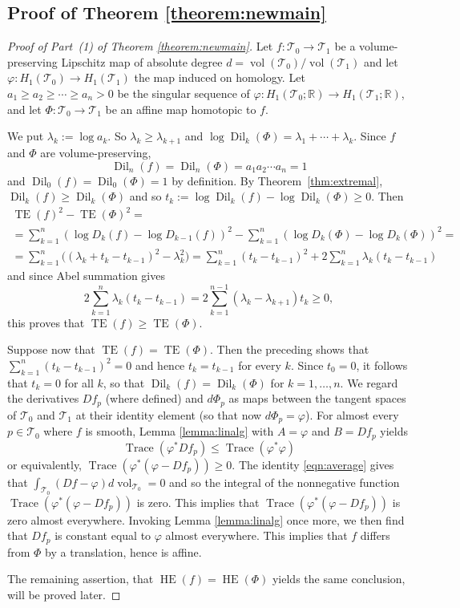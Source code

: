 \documentclass[11pt,letterpaper]{amsart}
\theoremstyle{definition}
\numberwithin{equation}{section}
\theoremstyle{definition}
\newcommand{\Tc}{\mathcal{T}}
\newcommand{\Rb}{\mathbb{R}}
\DeclareMathOperator{\tr}{Trace}
\DeclareMathOperator{\TE}{TE}
\DeclareMathOperator{\HE}{HE}
\newcommand{\Dil}{\operatorname{Dil}}
\newcommand{\vol}{\operatorname{vol}}
\begin{document}
\subsection{Proof of Theorem \ref{theorem:newmain}}
\begin{proof}[Proof of Part~(1) of Theorem \ref{theorem:newmain}]
Let $f:  \Tc_0\to \Tc_1$  be  a volume-preserving Lipschitz map of absolute degree $d=\vol(\Tc_0)/\vol(\Tc_1)$ and let $\varphi: H_1(\Tc_0)\to H_1(\Tc_1)$ the map induced on homology.  Let 
$a_1\ge a_2\ge\cdots \ge a_n>0$ be the singular sequence of 
$\varphi: H_1(\Tc_0; \Rb)\to H_1(\Tc_1; \Rb)$, and let $\Phi:\Tc_0\to\Tc_1$ be an affine map homotopic to $f$. 

We put $\lambda_k:=\log a_k$. So $\lambda_k\ge \lambda_{k+1}$ and 
$\log \Dil_k(\Phi)=\lambda_1+\cdots +\lambda_k$. Since  $f$ and $\Phi$ are volume-preserving, 
\[\Dil_n(f)=\Dil_n(\Phi)=a_1a_2\cdots a_n=1\] 
and $\Dil_0(f)=\Dil_0(\Phi)=1$ by definition. 
By Theorem~\ref{thm:extremal}, $\Dil_k(f)\ge \Dil_k(\Phi)$ and so $t_k:=\log  \Dil_k(f)-\log \Dil_k(\Phi) \ge 0$.  Then
\begin{multline*}
\textstyle     \TE(f)^2-\TE(\Phi)^2 =\\
\textstyle = \sum_{k=1}^n (\log D_k(f)-\log D_{k-1}(f) )^2 -  \sum_{k=1}^n (\log D_k(\Phi)-\log D_k(\Phi))^2=\\
\textstyle =\sum_{k=1}^n  \bigl( (\lambda_k+t_k-t_{k-1})^2 -\lambda_k^2  \bigr) =\sum_{k=1}^n (t_k-t_{k-1})^2  +
2\sum_{k=1}^n\lambda_k(t_k-t_{k-1}) 
\end{multline*}
and since Abel summation gives  
\[
\textstyle  2\sum_{k=1}^n\lambda_k(t_k-t_{k-1})=2\sum_{k=1}^{n-1}(\lambda_k -\lambda_{k+1})t_k\ge 0,
\]
 this proves that $\TE(f)\geq \TE(\Phi)$. 

 
Suppose now that $\TE(f)=\TE(\Phi)$. Then the preceding shows that $\sum_{k=1}^n(t_k-t_{k-1})^2=0$ and hence $t_k=t_{k-1}$ for every $k$. Since 
$t_0=0$, it follows that $t_k=0$ for all $k$, so that $\Dil_k(f)=\Dil_k(\Phi)$ for $k=1, \dots ,n$.
We regard the derivatives $Df_p$ (where defined) and $d\Phi_p$ as maps between the tangent spaces of $\Tc_0$ and $\Tc_1$ at their identity element (so that now $d\Phi_p=\varphi$).  For almost every $p\in \Tc_0$ where $f$ is smooth, Lemma \ref{lemma:linalg} with $A=\varphi$ and $B=Df_p$ yields
\begin{equation}\label{eqn:trace-pointwise}
\tr (\varphi^*Df_p)\le \tr (\varphi^*\varphi)
\end{equation}
or  equivalently,  $\tr (\varphi^*(\varphi-Df_p))\ge 0$. The identity   \eqref{eqn:average}  gives that  $\int_{\Tc_0} (Df-\varphi)  d\!\vol_{\Tc_0}=0$
and so the integral of the nonnegative function $\tr (\varphi^*(\varphi-Df_p))$ is zero. This implies that $\tr (\varphi^*(\varphi-Df_p))$ is zero almost everywhere. Invoking Lemma \ref{lemma:linalg} once more, we then find that $Df_p$ is constant equal to 
$\varphi$ almost everywhere. This implies that $f$ differs from $\Phi$ by a translation, hence is affine. 

The remaining assertion,  that  $\HE(f)=\HE(\Phi)$ yields the same conclusion, will be proved later.
\end{proof}
\end{document}
